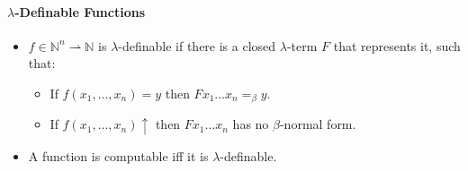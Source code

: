 \documentclass[twocolumn,english]{article}
\begin{document}
\paragraph{$\lambda$-Definable Functions}
\begin{itemize}
\item $f\in\mathbb{N}^{n}\rightharpoonup\mathbb{N}$ is $\lambda$-definable
if there is a closed $\lambda$-term $F$ that represents it, such
that:
\begin{itemize}
\item If $f\left(x_{1},\dots,x_{n}\right)=y$ then $Fx_{1}\dots x_{n}=_{\beta}y$.
\item If $f\left(x_{1},\dots,x_{n}\right)\uparrow$ then $Fx_{1}\dots x_{n}$
has no $\beta$-normal form.
\end{itemize}
\item A function is computable iff it is $\lambda$-definable.
\end{itemize}
\end{document}

